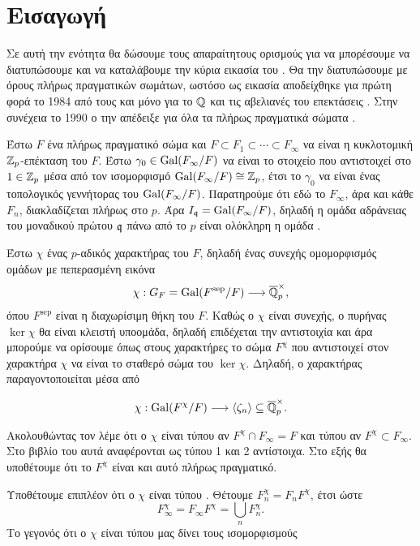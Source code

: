 \section{Εισαγωγή}

Σε αυτή την ενότητα θα δώσουμε τους απαραίτητους ορισμούς για να μπορέσουμε να διατυπώσουμε και να καταλάβουμε 
την κύρια εικασία του . Θα την διατυπώσουμε με όρους πλήρως πραγματικών σωμάτων, ωστόσο ως εικασία αποδείχθηκε για πρώτη φορά 
το 1984 από τους  και  μόνο για το $\mathbb{Q}$ και τις αβελιανές του επεκτάσεις \cite{MW}. Στην συνέχεια το 1990 ο  την απέδειξε για όλα τα πλήρως πραγματικά σώματα \cite{Wiles2}.

Έστω $F$ ένα πλήρως πραγματικό σώμα και $F\subset F_1 \subset \cdots \subset F_\infty$ να είναι η κυκλοτομική $\mathbb{Z}_p$-επέκταση του $F$. Έστω $\gamma_0 \in \operatorname{Gal}(F_\infty/F)$ να είναι το στοιχείο που αντιστοιχεί στο $1 \in \mathbb{Z}_p$ μέσα από τον ισομορφισμό $\operatorname{Gal}(F_\infty/F)\cong \mathbb{Z}_p$, έτσι το $\gamma_0$ να είναι ένας τοπολογικός γεννήτορας του $\operatorname{Gal}(F_\infty/F)$. Παρατηρούμε ότι εδώ το $F_\infty$, άρα και κάθε $F_n$, διακλαδίζεται πλήρως στο $p$. Άρα $I_{\mathfrak{q}} = \operatorname{Gal}(F_\infty/F)$, δηλαδή η ομάδα αδράνειας του μοναδικού πρώτου $\mathfrak{q}$ πάνω από το $p$ είναι ολόκληρη η ομάδα .

Έστω $\chi$ ένας $p$-αδικός  χαρακτήρας του $F$, δηλαδή ένας συνεχής ομομορφισμός ομάδων με πεπερασμένη εικόνα
$$\chi : G_F = \operatorname{Gal}(F^{\operatorname{sep}}/F) \longrightarrow \overline{\mathbb{Q}}_p^\times ,$$  όπου $F^{\operatorname{sep}}$ είναι η διαχωρίσιμη θήκη του $F$. Καθώς ο $\chi$ είναι συνεχής, ο πυρήνας $\ker\chi$ θα είναι κλειστή υποομάδα, δηλαδή επιδέχεται την αντιστοιχία  και άρα μπορούμε να ορίσουμε όπως στους χαρακτήρες  το σώμα $F^\chi$ που αντιστοιχεί στον χαρακτήρα $\chi$ να είναι το σταθερό σώμα του $\ker\chi$. Δηλαδή, ο χαρακτήρας παραγοντοποιείται μέσα από

$$\chi: \operatorname{Gal}(F^\chi/F) \longrightarrow \left< \zeta_n \right> \subseteq \overline{\mathbb{Q}}_p^\times .$$ 

\noindent Ακολουθώντας τον  \cite{Wiles2} λέμε ότι ο $\chi$ είναι τύπου  αν $F^\chi \cap F_\infty = F$ και τύπου  αν 
$F^\chi \subset F_\infty$. Στο βιβλίο του  \cite{Wash} αυτά αναφέρονται ως τύπου 1 και 2 αντίστοιχα. Στο εξής θα 
υποθέτουμε ότι το $F^\chi$ είναι και αυτό πλήρως πραγματικό.

Υποθέτουμε επιπλέον ότι ο $\chi$ είναι τύπου . Θέτουμε $F^\chi_n = F_n F^\chi$, έτσι ώστε $$F^\chi_\infty  = F_\infty F^\chi = \bigcup\limits_n F^\chi_n.$$ Το γεγονός ότι ο $\chi$ είναι τύπου  μας δίνει τους ισομορφισμούς

